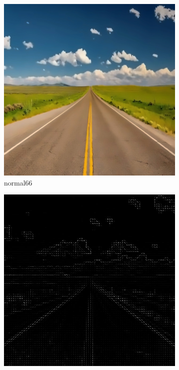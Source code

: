 \documentclass[a4paper, 10pt]{article}
\begin{document}
\begin{figure}[htbp]
		\begin{subfigure}{0.24\textwidth}
			\includegraphics[width=\linewidth]{picture/alldata/normal66}
			\caption{normal66}
			\label{fig: normal66}	
		\end{subfigure}
		\begin{subfigure}{0.24\textwidth}
			\includegraphics[width=\linewidth]{picture/alldata_hog/normal66}

\end{subfigure}
\end{figure}
\end{document}
